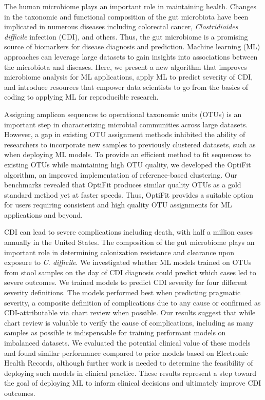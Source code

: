 The human microbiome plays an important role in maintaining health.
Changes in the taxonomic and functional composition of the gut microbiota have
been implicated in numerous diseases including colorectal cancer,
\textit{Clostridioides difficile} infection (CDI), and others.
Thus, the gut microbiome is a promising source of biomarkers for disease
diagnosis and prediction.
Machine learning (ML) approaches can leverage large datasets to gain insights
into associations between the microbiota and diseases.
Here, we present a new algorithm that improves microbiome analysis for ML applications,
apply ML to predict severity of CDI,
and introduce resources that empower data scientists to go from the basics of
coding to applying ML for reproducible research.

Assigning amplicon sequences to operational taxonomic units (OTUs) is an
important step in characterizing microbial communities across large datasets.
However, a gap in existing OTU assignment methods inhibited the ability of
researchers to incorporate new samples to previously clustered datasets,
such as when deploying ML models.
To provide an efficient method to fit sequences to existing OTUs while
maintaining high OTU quality, we developed the OptiFit algorithm, an improved
implementation of reference-based clustering.
Our benchmarks revealed that OptiFit produces similar quality OTUs as a gold
standard method yet at faster speeds.
Thus, OptiFit provides a suitable option for users requiring consistent and
high quality OTU assignments for ML applications and beyond.

CDI can lead to severe complications including death, with half a million cases
annually in the United States.
The composition of the gut microbiome plays an important role in determining
colonization resistance and clearance upon exposure to \textit{C. difficile}.
We investigated whether ML models trained on OTUs from stool samples on
the day of CDI diagnosis could predict which cases led to severe outcomes.
We trained models to predict CDI severity for four different severity definitions.
The models performed best when predicting pragmatic severity, a composite
definition of complications due to any cause or confirmed as CDI-attributable
via chart review when possible.
Our results suggest that while chart review is valuable to verify the cause of
complications, including as many samples as possible is indispensable for
training performant models on imbalanced datasets.
We evaluated the potential clinical value of these models and found
similar performance compared to prior models based on Electronic Health Records,
although further work is needed to determine the feasibility of deploying such
models in clinical practice.
These results represent a step toward the goal of deploying ML to
inform clinical decisions and ultimately improve CDI outcomes.

